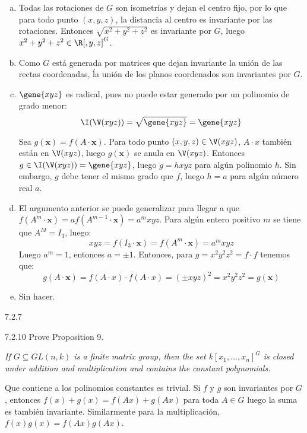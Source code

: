 \documentclass[twoside]{article}
\begin{document}
\begin{solucion}
\begin{enumerate}[a.]
\item Todas las rotaciones de $G$ son isometrías y dejan el centro fijo, por lo que para todo punto $(x,y,z)$, la distancia al centro es invariante por las rotaciones.
Entonces $\sqrt{x^2+y^2+z^2}$ es invariante por $G$, luego $x^2+y^2+z^2 \in \R[,y,z]^G$.

\item Como $G$ está generada por matrices que dejan invariante la unión de las rectas coordenadas, ĺa unión de los planos coordenados son invariantes por $G$.

\item $\gene{xyz}$ es radical, pues no puede estar generado por un polinomio de grado menor:
\[ \I(\V(xyz)) = \sqrt{\gene{xyz}} = \gene{xyz} \]

Sea $g(\mathbf{x}) = f(A \cdot \mathbf{x})$.
Para todo punto $(x,y,z) \in \V(xyz)$, $A \cdot x$ también están en $\V(xyz)$, luego $g(\mathbf{x})$ se anula en $\V(xyz)$.
Entonces $g \in \I(\V(xyz)) = \gene{xyz}$, luego $g = hxyz$ para algún polinomio $h$.
Sin embargo, $g$ debe tener el mismo grado que $f$, luego $h=a$ para algún número real $a$.

\item El argumento anterior se puede generalizar para llegar a que $f(A^m \cdot \mathbf{x}) = a f(A^{m-1}\cdot \mathbf{x}) = a^m xyz$.
Para algún entero positivo $m$ se tiene que $A^M = I_3$, luego:
\[ xyz = f(I_3 \cdot \mathbf{x}) = f(A^m \cdot \mathbf{x}) = a^m xyz \]
Luego $a^m = 1$, entonces $a = \pm 1$.
Entonces, para $g = x^2y^2z^2 = f\cdot f$ tenemos que:
\[ g(A \cdot \mathbf{x}) = f(A \cdot x)\cdot f(A \cdot x) = (\pm xyz)^2 = x^2y^2z^2 = g(\mathbf{x})\]

\item Sin hacer.
\end{enumerate}

\end{solucion}
\newpage

\begin{ejercicio}{7.2.7}

\end{ejercicio}
\begin{solucion}

\end{solucion}
\newpage

\begin{ejercicio}{7.2.10}
Prove Proposition 9.
\end{ejercicio}
\begin{solucion}
\emph{If $G ⊆ GL(n, k)$ is a finite matrix group, then the set $k[x_1, \dots , x_n]^G$
is closed under addition and multiplication and contains the constant polynomials.}


Que contiene a los polinomios constantes es trivial. Si $f$ y $g$ son invariantes por $G$, entonces $f(x)+g(x)=f(Ax)+g(Ax)$ para toda $A\in G$ luego la suma es también invariante. Similarmente para la multiplicación, $f(x)g(x)=f(Ax)g(Ax)$. 
\end{solucion}
\end{document}
